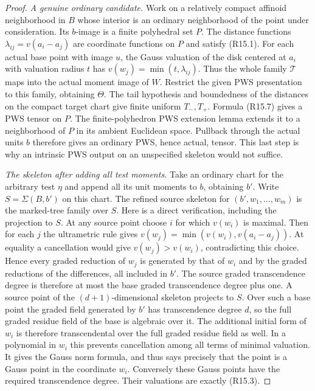 \begin{proof}
\emph{A genuine ordinary candidate.}
Work on a relatively compact affinoid neighborhood in $B$ whose
interior is an ordinary neighborhood of the point under consideration.
Its $b$-image is a finite polyhedral set $P$.  The distance functions
$\lambda_{ij}=v(a_i-a_j)$ are coordinate functions on $P$ and satisfy
(R15.1).  For each actual base point with image $u$, the Gauss
valuation of the disk centered at $a_i$ with valuation radius $t$
has $v(w_j)=\min(t,\lambda_{ij})$.  Thus the whole family
$\mathcal T$ maps into the actual moment image of $W$.
Restrict the given PWS presentation to this family, obtaining
$\Theta$.  The tail hypothesis and boundedness of the distances on
the compact target chart give finite uniform $T_-,T_+$.  Formula
(R15.7) gives a PWS tensor on $P$.  The finite-polyhedron PWS
extension lemma extends it to a neighborhood of $P$ in its ambient
Euclidean space.  Pullback through the actual units $b$ therefore
gives an ordinary PWS, hence actual, tensor.  This last step is why
an intrinsic PWS output on an unspecified skeleton would not suffice.

\emph{The skeleton after adding all test moments.}
Take an ordinary chart for the arbitrary test $\eta$ and append all
its unit moments to $b$, obtaining $b'$.  Write
$S=\Sigma(B,b')$ on this chart.  The refined source skeleton for
$(b',w_1,\ldots,w_m)$ is the marked-tree family over $S$.
Here is a direct verification, including the projection to $S$.
At any source point choose $i$ for which $v(w_i)$ is maximal.
Then for each $j$ the ultrametric rule gives
$v(w_j)=\min(v(w_i),v(a_i-a_j))$.  At equality a cancellation
would give $v(w_j)>v(w_i)$, contradicting this choice.  Hence every
graded reduction of $w_j$ is generated by that of $w_i$ and by
the graded reductions of the differences, all included in $b'$.
The source graded transcendence degree is therefore at most the
base graded transcendence degree plus one.  A source point of
the $(d+1)$-dimensional skeleton projects to $S$.  Over such a
base point the graded field generated by $b'$ has transcendence
degree $d$, so the full graded residue field of the base is algebraic
over it.  The additional initial form of $w_i$ is therefore
transcendental over the full graded residue field as well.  In a
polynomial in $w_i$ this prevents cancellation among all terms of
minimal valuation.  It gives the Gauss norm formula, and thus says
precisely that the point is a Gauss point in the coordinate $w_i$.
Conversely these Gauss points have the required transcendence
degree.  Their valuations are exactly (R15.3).


\end{proof}
